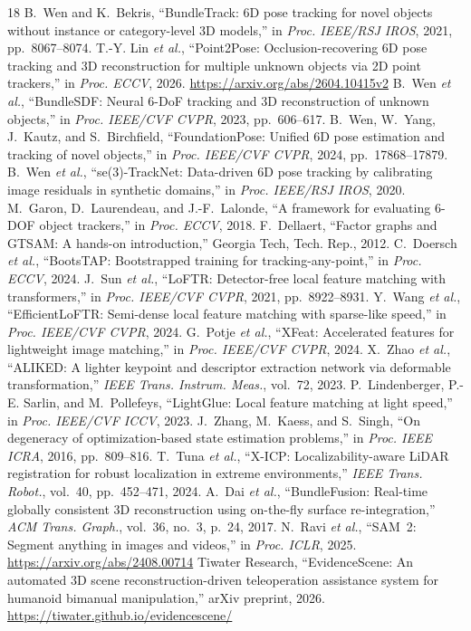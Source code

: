 \documentclass[10pt,journal]{IEEEtran}
\begin{document}
\begin{thebibliography}{18}
 B.~Wen and K.~Bekris, ``BundleTrack: 6D pose tracking for novel objects without instance or category-level 3D models,'' in \emph{Proc. IEEE/RSJ IROS}, 2021, pp.~8067--8074.
 T.-Y. Lin \emph{et al.}, ``Point2Pose: Occlusion-recovering 6D pose tracking and 3D reconstruction for multiple unknown objects via 2D point trackers,'' in \emph{Proc. ECCV}, 2026. \url{https://arxiv.org/abs/2604.10415v2}
 B.~Wen \emph{et al.}, ``BundleSDF: Neural 6-DoF tracking and 3D reconstruction of unknown objects,'' in \emph{Proc. IEEE/CVF CVPR}, 2023, pp.~606--617.
 B.~Wen, W.~Yang, J.~Kautz, and S.~Birchfield, ``FoundationPose: Unified 6D pose estimation and tracking of novel objects,'' in \emph{Proc. IEEE/CVF CVPR}, 2024, pp.~17868--17879.
 B.~Wen \emph{et al.}, ``se(3)-TrackNet: Data-driven 6D pose tracking by calibrating image residuals in synthetic domains,'' in \emph{Proc. IEEE/RSJ IROS}, 2020.
 M.~Garon, D.~Laurendeau, and J.-F.~Lalonde, ``A framework for evaluating 6-DOF object trackers,'' in \emph{Proc. ECCV}, 2018.
 F.~Dellaert, ``Factor graphs and GTSAM: A hands-on introduction,'' Georgia Tech, Tech. Rep., 2012.
 C.~Doersch \emph{et al.}, ``BootsTAP: Bootstrapped training for tracking-any-point,'' in \emph{Proc. ECCV}, 2024.
 J.~Sun \emph{et al.}, ``LoFTR: Detector-free local feature matching with transformers,'' in \emph{Proc. IEEE/CVF CVPR}, 2021, pp.~8922--8931.
 Y.~Wang \emph{et al.}, ``EfficientLoFTR: Semi-dense local feature matching with sparse-like speed,'' in \emph{Proc. IEEE/CVF CVPR}, 2024.
 G.~Potje \emph{et al.}, ``XFeat: Accelerated features for lightweight image matching,'' in \emph{Proc. IEEE/CVF CVPR}, 2024.
 X.~Zhao \emph{et al.}, ``ALIKED: A lighter keypoint and descriptor extraction network via deformable transformation,'' \emph{IEEE Trans. Instrum. Meas.}, vol.~72, 2023.
 P.~Lindenberger, P.-E. Sarlin, and M.~Pollefeys, ``LightGlue: Local feature matching at light speed,'' in \emph{Proc. IEEE/CVF ICCV}, 2023.
 J.~Zhang, M.~Kaess, and S.~Singh, ``On degeneracy of optimization-based state estimation problems,'' in \emph{Proc. IEEE ICRA}, 2016, pp.~809--816.
 T.~Tuna \emph{et al.}, ``X-ICP: Localizability-aware LiDAR registration for robust localization in extreme environments,'' \emph{IEEE Trans. Robot.}, vol.~40, pp.~452--471, 2024.
 A.~Dai \emph{et al.}, ``BundleFusion: Real-time globally consistent 3D reconstruction using on-the-fly surface re-integration,'' \emph{ACM Trans. Graph.}, vol.~36, no.~3, p.~24, 2017.
 N.~Ravi \emph{et al.}, ``SAM~2: Segment anything in images and videos,'' in \emph{Proc. ICLR}, 2025. \url{https://arxiv.org/abs/2408.00714}
 Tiwater Research, ``EvidenceScene: An automated 3D scene reconstruction-driven teleoperation assistance system for humanoid bimanual manipulation,'' arXiv preprint, 2026. \url{https://tiwater.github.io/evidencescene/}
\end{thebibliography}
\end{document}
